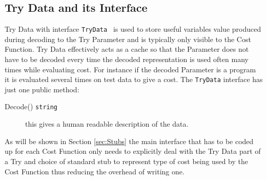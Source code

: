 \documentclass[a4paper,oneside,english]{book}
\numberwithin{equation}{section}
\numberwithin{figure}{section}
\begin{document}
\subsection{Try Data and its Interface}
Try Data  with interface \texttt{TryData } is used to store useful  variables value produced during decoding to  the Try Parameter and is typically only visible to the Cost Function. Try Data effectively acts as a cache so that the Parameter does not have to be decoded every time the decoded representation is used often many times while evaluating cost. For instance if the decoded Parameter is a program it is evaluated several times on test data to give a cost. The \texttt{TryData} interface has just one public method:
\begin{description}
	\item[Decode() \texttt{string}] this gives a human readable description of the data.
\end{description}
 
As will be shown in Section \ref{sec:Stubs} the main interface  that has to be coded up for each Cost Function only needs to explicitly deal with the Try Data part of a Try and choice of standard stub to represent type of cost being used by the Cost Function thus reducing the overhead of writing one.
\end{document}
